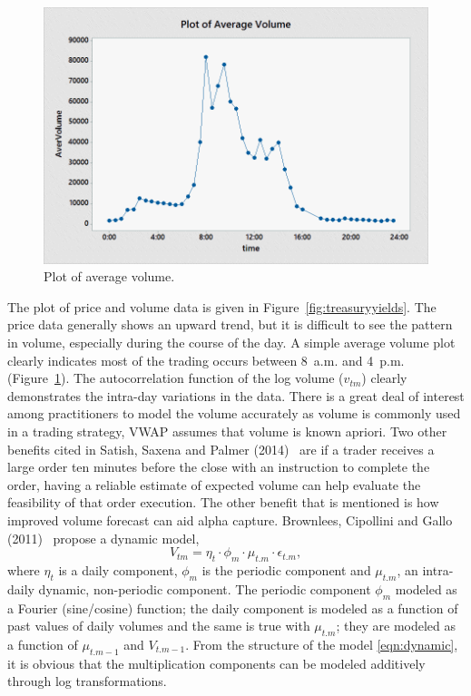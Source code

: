         \begin{figure}[!ht]
        \centering
        \includegraphics[width=\textwidth]{chapters/chapter_stat_ts/figures/avgvol.png}
        \caption{Plot of average volume. \label{fig:averagevolume}}
        \end{figure}

The plot of price and volume data is given in Figure~\ref{fig:treasuryyields}. The price data generally shows an upward trend, but it is difficult to see the pattern in volume, especially during the course of the day. A simple average volume plot clearly indicates most of the trading occurs between 8~a.m. and 4~p.m. (Figure~\ref{fig:averagevolume}). The autocorrelation function of the log volume ($v_{tm}$) clearly demonstrates the intra-day variations in the data. There is a great deal of interest among practitioners to model the volume accurately as volume is commonly used in a trading strategy, VWAP assumes that volume is known apriori. Two other benefits cited in Satish, Saxena and Palmer (2014)~\cite{satish} are if a trader receives a large order ten minutes before the close with an instruction to complete the order, having a reliable estimate of expected volume can help evaluate the feasibility of that order execution. The other benefit that is mentioned is how improved volume forecast can aid alpha capture. Brownlees, Cipollini and Gallo (2011)~\cite{brownless} propose a dynamic model,
	\begin{equation} \label{eqn:dynamic}
	V_{tm}= \eta_t \cdot \phi_m \cdot \mu_{t.m} \cdot \epsilon_{t.m},
	\end{equation}
where $\eta_t$ is a daily component, $\phi_m$ is the periodic component and $\mu_{t.m}$, an intra-daily dynamic, non-periodic component. The periodic component $\phi_m$ modeled as a Fourier (sine/cosine) function; the daily component is modeled as a function of past values of daily volumes and the same is true with $\mu_{t.m}$; they are modeled as a function of $\mu_{t.m-1}$ and $V_{t.m-1}$. From the structure of the model \eqref{eqn:dynamic}, it is obvious that the multiplication components can be modeled additively through log transformations.


